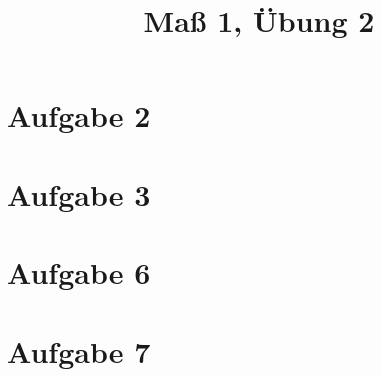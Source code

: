 \documentclass[]{article}
\author{}
\title{Maß 1, Übung 2}
\begin{document}
    \begin{titlepage}
        \maketitle
    \end{titlepage}
    
    \section{Aufgabe 2}
    
    \section{Aufgabe 3}
    
    \section{Aufgabe 6}
    
    \section{Aufgabe 7}
    

    
    
\end{document}
